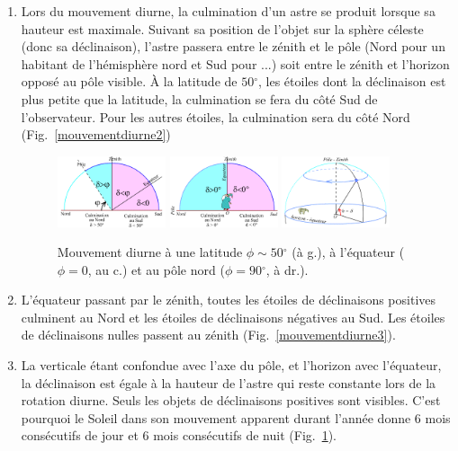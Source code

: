 \documentclass[a4paper,10pt]{report}
\renewcommand{\deg}{\ensuremath{^{\circ}}}
\begin{document}
\begin{Answer}
  \begin{enumerate}
  \item Lors du mouvement diurne, la culmination d'un astre se produit
    lorsque sa hauteur est maximale.  Suivant sa position de l'objet
    sur la sphère céleste (donc sa déclinaison), l'astre passera entre
    le zénith et le pôle (Nord pour un habitant de l'hémisphère nord
    et Sud pour ...) soit entre le zénith et l'horizon opposé au pôle
    visible. À la latitude de $50\deg$, les étoiles dont la
    déclinaison est plus petite que la latitude, la culmination se
    fera du côté Sud de l'observateur.  Pour les autres étoiles, la
    culmination sera du côté Nord (Fig.~\ref{mouvementdiurne2})

    \begin{figure}[htp]
      \centering
      \includegraphics[width=0.3\textwidth]{mouvement_diurne2}
      \includegraphics[width=0.3\textwidth]{mouvement_diurne3}
      \includegraphics[width=0.3\textwidth]{mouvement_diurne4}
      \label{mouvementdiurne2}
      \label{mouvementdiurne3}
      \label{mouvementdiurne4}
      \caption{Mouvement diurne à une latitude $\phi\sim 50\deg$
        (à g.), à l'équateur ($\phi = 0$, au c.) et au pôle nord
        ($\phi = 90\deg$, à dr.).}
    \end{figure}

  \item L'équateur passant par le zénith, toutes les étoiles de
    déclinaisons positives culminent au Nord et les étoiles de
    déclinaisons négatives au Sud. Les étoiles de déclinaisons nulles
    passent au zénith (Fig.~\ref{mouvementdiurne3}).

  \item La verticale étant confondue avec l'axe du pôle, et l'horizon
    avec l'équateur, la déclinaison est égale à la hauteur de l'astre
    qui reste constante lors de la rotation diurne.  Seuls les objets
    de déclinaisons positives sont visibles. C'est pourquoi le Soleil
    dans son mouvement apparent durant l'année donne 6 mois
    consécutifs de jour et 6 mois consécutifs de nuit
    (Fig.~\ref{mouvementdiurne4}).
  \end{enumerate}
\end{Answer}
\end{document}
